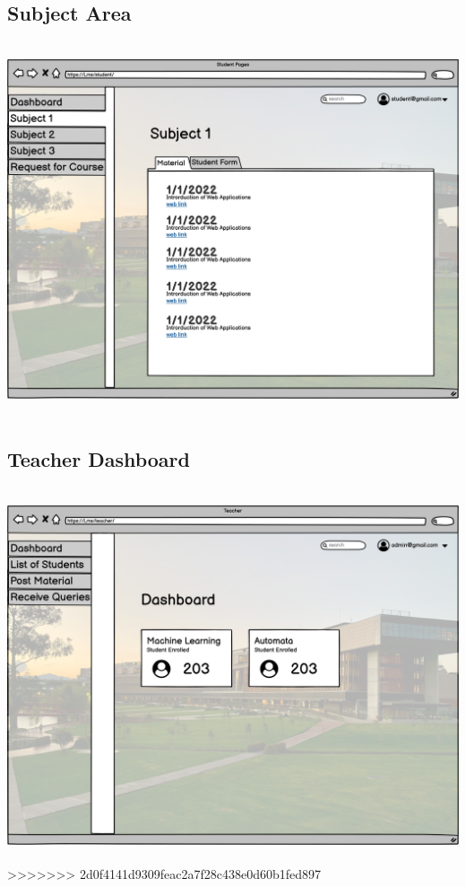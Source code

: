 \subsection{Subject Area}

\includegraphics[width=18cm, height=11cm]{HW_1/images/Subject 1 student.png}

\subsection{Teacher Dashboard}

\includegraphics[width=18cm, height=11cm]{HW_1/images/Teacher Deshboard.png}
>>>>>>> 2d0f4141d9309feac2a7f28c438e0d60b1fed897

